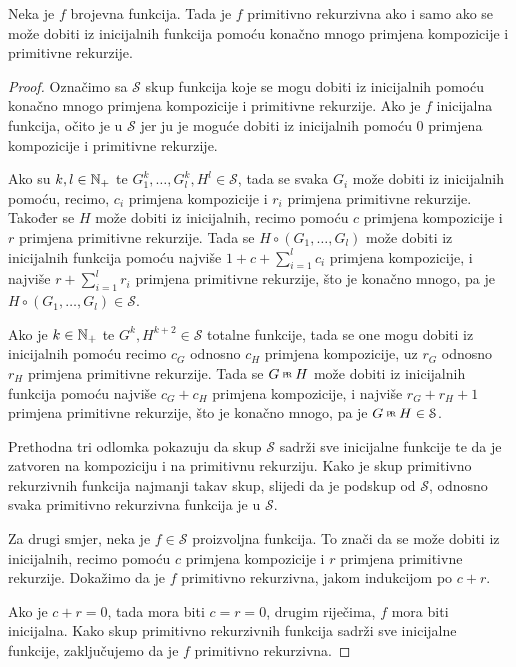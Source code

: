 \begin{propozicija}[{name=[simboličke definicije primitivno rekurzivnih funkcija]}]\label{prop:symbdef}
Neka je $f$ brojevna funkcija. Tada je $f$ primitivno rekurzivna ako i samo ako se može dobiti iz inicijalnih funkcija pomoću konačno mnogo primjena kompozicije i primitivne rekurzije.
\end{propozicija}
\begin{proof}
Označimo sa $\mathcal S$ skup funkcija koje se mogu dobiti iz inicijalnih pomoću ko\-nač\-no mnogo primjena kompozicije i primitivne rekurzije. Ako je $f$ inicijalna funkcija, očito je u $\mathcal S$ jer ju je moguće dobiti iz inicijalnih pomoću $0$ primjena kompozicije i primitivne rekurzije.

Ako su $k,l\in{\mathbb N}_+$ te $G_1^k,\dotsc,G_l^k,H^l\in\mathcal S$, tada se svaka $G_i$ može dobiti iz inicijalnih pomoću, recimo, $c_i$ primjena kompozicije i $r_i$ primjena primitivne rekurzije. Također se $H$ može dobiti iz inicijalnih, recimo pomoću $c$ primjena kompozicije i $r$ primjena primitivne rekurzije. Tada se $H\circ(G_1,\dotsc,G_l)$ može dobiti iz inicijalnih funkcija pomoću najviše $1+c+\sum_{i=1}^lc_i$ primjena kompozicije, i najviše $r+\sum_{i=1}^lr_i$ primjena primitivne rekurzije, što je konačno mnogo, pa je $H\circ(G_1,\dotsc,G_l)\in\mathcal S$.

Ako je $k\in{\mathbb N}_+$ te $G^k,H^{k+2}\in\mathcal S$ totalne funkcije, tada se one mogu dobiti iz inicijalnih pomoću recimo $c_G$ odnosno $c_H$ primjena kompozicije, uz $r_G$ odnosno $r_H$ primjena primitivne rekurzije. Tada se $G\pr H$ može dobiti iz inicijalnih funkcija pomoću najviše $c_G+c_H$ primjena kompozicije, i najviše $r_G+r_H+1$ primjena primitivne rekurzije, što je konačno mnogo, pa je $G\pr H\in\mathcal S$.

Prethodna tri odlomka pokazuju da skup $\mathcal S$ sadrži sve inicijalne funkcije te da je zatvoren na kompoziciju i na primitivnu rekurziju. Kako je skup primitivno rekurzivnih funkcija najmanji takav skup, slijedi da je podskup od $\mathcal S$, odnosno svaka primitivno rekurzivna funkcija je u $\mathcal S$.

Za drugi smjer, neka je $f\in\mathcal S$ proizvoljna funkcija. To znači da se može dobiti iz inicijalnih, recimo pomoću $c$ primjena kompozicije i $r$ primjena primitivne rekurzije. Dokažimo da je $f$ primitivno rekurzivna, jakom indukcijom po $c+r$.

Ako je $c+r=0$, tada mora biti $c=r=0$, drugim riječima, $f$ mora biti inicijalna. Kako skup primitivno rekurzivnih funkcija sadrži sve inicijalne funkcije, zaključujemo da je $f$ primitivno rekurzivna.


\end{proof}
